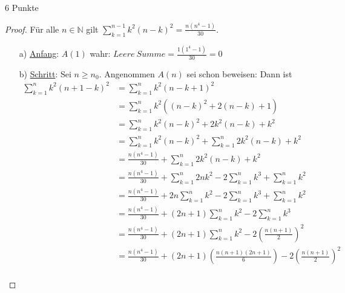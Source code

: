 \documentclass{problemset}
\begin{document}
\begin{problem}[Summenformeln]{6 Punkte}
\begin{proof}
    Für alle $n \in \mathbb{N}$ gilt $\sum_{k = 1}^{n - 1} k^2(n - k)^2 = \frac{n(n^4 - 1)}{30}$.
    \begin{enumerate}
        \item[a)] \underline{Anfang}: $A(1)$ wahr: $Leere\ Summe = \frac{1(1^4
              - 1)}{30} = 0$
        \item[b)] \underline{Schritt}: Sei $n \ge n_0$. Angenommen $A(n)$ sei
              schon beweisen: Dann ist
              \begin{align}
                  \sum_{k = 1}^{n} k^2(n + 1 - k)^2 & = \sum_{k = 1}^{n} k^2(n - k + 1)^2                                                                       \\
                                                    & = \sum_{k = 1}^{n} k^2((n - k)^2 + 2(n-k)+ 1)                                                             \\
                                                    & = \sum_{k = 1}^{n} k^2(n - k)^2 + 2k^2(n-k) + k^2                                                         \\
                                                    & = \sum_{k = 1}^{n} k^2(n - k)^2 + \sum_{k=1}^{n} 2k^2(n-k) + k^2                                          \\
                                                    & = \frac{n(n^4 - 1)}{30} + \sum_{k=1}^{n} 2k^2(n-k) + k^2                                                  \\
                                                    & = \frac{n(n^4 - 1)}{30} + \sum_{k=1}^{n} 2nk^2 - 2\sum_{k=1}^{n} k^3 + \sum_{k=1}^{n} k^2                 \\
                                                    & = \frac{n(n^4 - 1)}{30} + 2n\sum_{k=1}^{n} k^2 - 2\sum_{k=1}^{n} k^3 + \sum_{k=1}^{n} k^2                 \\
                                                    & = \frac{n(n^4 - 1)}{30} + (2n+1)\sum_{k=1}^{n} k^2 - 2\sum_{k=1}^{n} k^3 \tag{aus 1.a}                    \\
                                                    & = \frac{n(n^4 - 1)}{30} + (2n+1)\sum_{k=1}^{n} k^2 - 2\left(\frac{n(n+1)}{2}\right)^2 \tag{aus Vorlesung} \\
                                                    & = \frac{n(n^4 - 1)}{30} + (2n+1)\left(\frac{n(n+1)(2n+1)}{6}\right) - 2\left(\frac{n(n+1)}{2}\right)^2    \\

\end{align}
\end{enumerate}
\end{proof}
\end{problem}
\end{document}
